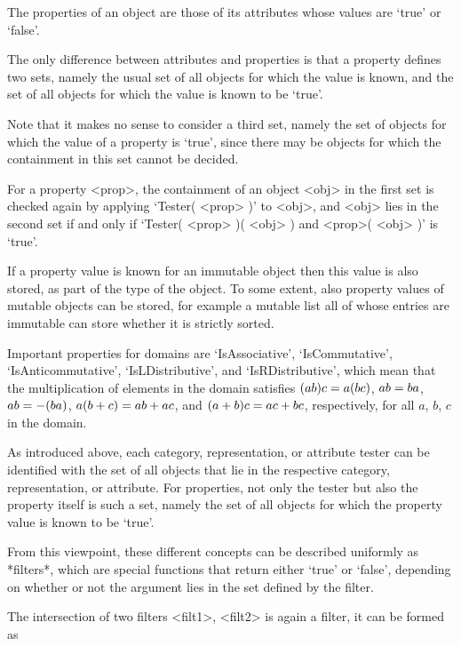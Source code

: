 The properties of an object are those of its attributes whose values are
`true' or `false'.

The only difference between attributes and properties is that a property
defines two sets,
namely the usual set of all objects for which the value is known,
and the set of all objects for which the value is known to be `true'.

Note that it makes no sense to consider a third set, namely the set of
objects for which the value of a property is `true', since there may be
objects for which the containment in this set cannot be decided.

For a property <prop>, the containment of an object <obj> in the first
set is checked again by applying `Tester( <prop> )' to <obj>,
and <obj> lies in the second set if and only if
`Tester( <prop> )( <obj> ) and <prop>( <obj> )' is `true'.

If a property value is known for an immutable object then this value is
also stored, as part of the type of the object.
To some extent, also property values of mutable objects can be stored,
for example a mutable list all of whose entries are immutable can store
whether it is strictly sorted.

Important properties for domains are `IsAssociative', `IsCommutative',
`IsAnticommutative', `IsLDistributive', and `IsRDistributive',
which mean that the multiplication of elements in the domain satisfies
$(a \* b ) \* c = a \* ( b \* c )$, $a \* b = b \* a$,
$a \* b = - ( b \* a )$, $a \* ( b + c ) = a \* b + a \* c$,
and $( a + b ) \* c = a \* c + b \* c$, respectively,
for all $a$, $b$, $c$ in the domain.


As introduced above, each category, representation, or attribute tester
can be identified with the set of all objects that lie in the respective
category, representation, or attribute.
For properties, not only the tester but also the property itself is such
a set,
namely the set of all objects for which the property value is known to be
`true'.

{}From this viewpoint, these different concepts can be described
uniformly as *filters*,
which are special {\GAP} functions that return either `true' or `false',
depending on whether or not the argument lies in the set defined by the
filter.

The intersection of two filters <filt1>, <filt2> is again a filter,
it can be formed as

